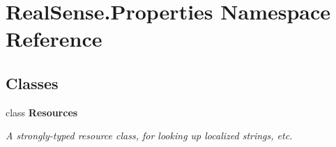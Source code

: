 \section{Real\+Sense.\+Properties Namespace Reference}
\label{namespace_real_sense_1_1_properties}
\subsection*{Classes}
\begin{DoxyCompactItemize}
\item 
class {\bfseries Resources}
\begin{DoxyCompactList}\small\item\em A strongly-\/typed resource class, for looking up localized strings, etc. \end{DoxyCompactList}\end{DoxyCompactItemize}
